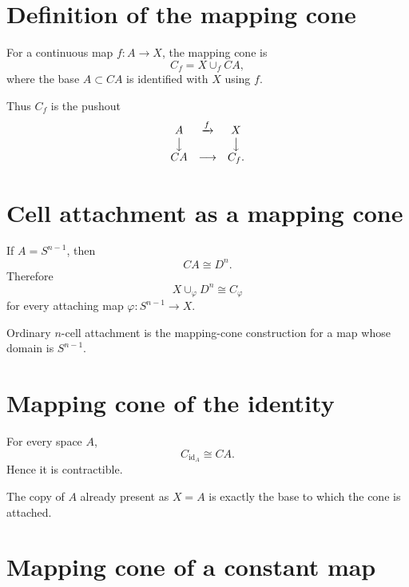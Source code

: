 \section{Definition of the mapping cone}

\begin{definition}
\label{def:viii07-mapping-cone}
For a continuous map \(f:A\to X\), the mapping cone is
\[
C_f=X\cup_f CA,
\]
where the base \(A\subset CA\) is identified with \(X\) using \(f\).
\end{definition}

Thus \(C_f\) is the pushout
\[
\begin{array}{ccc}
A&\xrightarrow{f}&X\\
\big\downarrow&&\big\downarrow\\
CA&\longrightarrow&C_f.
\end{array}
\]

\section{Cell attachment as a mapping cone}

If \(A=S^{n-1}\), then
\[
CA\cong D^n.
\]
Therefore
\[
X\cup_\varphi D^n
\cong
C_\varphi
\]
for every attaching map \(\varphi:S^{n-1}\to X\).

\begin{proposition}
\label{prop:viii07-cell-special}
Ordinary \(n\)-cell attachment is the mapping-cone construction for a map
whose domain is \(S^{n-1}\).
\end{proposition}

\section{Mapping cone of the identity}

\begin{proposition}
\label{prop:viii07-id}
For every space \(A\),
\[
C_{\operatorname{id}_A}\cong CA.
\]
Hence it is contractible.
\end{proposition}

The copy of \(A\) already present as \(X=A\) is exactly the base to which the
cone is attached.

\section{Mapping cone of a constant map}

